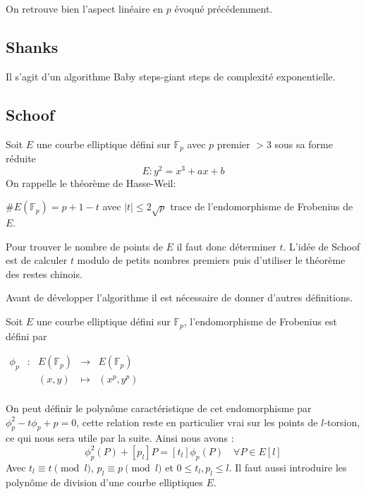 \documentclass{article}
\begin{document}
On retrouve bien l'aspect linéaire en $p$ évoqué précédemment.
\subsection{Shanks}
Il s'agit d'un algorithme Baby steps-giant steps de complexité exponentielle.

\subsection{Schoof}
Soit $E$ une courbe elliptique défini sur $\mathbb{F}_p$ avec $p$ premier $>3$ sous sa forme réduite 
$$ E: y^2 = x^3 + ax+b$$
On rappelle le théorème de Hasse-Weil:

\begin{thm}
$\#E(\mathbb{F}_p) = p + 1 - t$ avec $|t| \leq 2 \sqrt{p}$ trace de l'endomorphisme de Frobenius de $E$.
\end{thm}
Pour trouver le nombre de points de $E$ il faut donc déterminer $t$. 
L'idée de Schoof est de calculer $t$ modulo de petits nombres premiers puis d'utiliser le théorème des restes chinois. 

Avant de développer l'algorithme il est nécessaire de donner d'autres définitions. 

\begin{defi}[Frobenius]
Soit $E$ une courbe elliptique défini sur $\mathbb{F}_p$, l'endomorphisme de Frobenius est défini par 

$\begin{array}{ccccc}
\phi_p & : & E(\mathbb{F}_p) & \to & E(\mathbb{F}_p) \\
 & & (x,y) & \mapsto & (x^p, y^p) \\
\end{array}$
\end{defi}
On peut définir le polynôme caractéristique de cet endomorphisme par $\phi_p^2 - t \phi_p + p = 0$, cette relation reste en particulier vrai sur les points de $l$-torsion, ce qui nous sera utile par la suite. Ainsi nous avons : 
\begin{equation}
\label{eqnfrobenius}
 \phi_p^2(P)  + [p_l]P = [t_{l}] \phi_p(P) \quad \forall P \in E[l]
\end{equation} 
Avec $t_l \equiv t \pmod l$, $p_l \equiv p \pmod l$ et $0 \leq t_l, p_l \leq l$. 
\newline
Il faut aussi introduire les polynôme de division d'une courbe elliptiques $E$.
\end{document}

